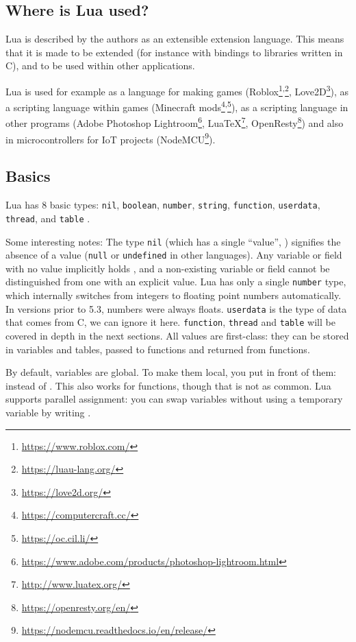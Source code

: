\subsection{Where is Lua used?}
Lua is described by the authors as an extensible extension language\cite{ierusalimschy1996lua}. This means that it is made to be extended (for instance with bindings to libraries written in C), and to be used within other applications.

Lua is used for example as a language for making games (Roblox\footnote{\url{https://www.roblox.com/}}\textsuperscript{,}\footnote{\url{https://luau-lang.org/}}, Love2D\footnote{\url{https://love2d.org/}}), as a scripting language within games (Minecraft mods\footnote{\url{https://computercraft.cc/}}\textsuperscript{,}\footnote{\url{https://oc.cil.li/}}), as a scripting language in other programs (Adobe Photoshop Lightroom\footnote{\url{https://www.adobe.com/products/photoshop-lightroom.html}}, LuaTeX\footnote{\url{http://www.luatex.org/}}, OpenResty\footnote{\url{https://openresty.org/en/}}) and also in microcontrollers for IoT projects (NodeMCU\footnote{\url{https://nodemcu.readthedocs.io/en/release/}}).

\subsection{Basics}
Lua has 8 basic types: \texttt{nil}, \texttt{boolean}, \texttt{number}, \texttt{string}, \texttt{function}, \texttt{userdata}, \texttt{thread}, and \texttt{table} \cite[\S 2.1]{luareferencemanual}.

Some interesting notes:
The type \texttt{nil} (which has a single ``value'', ) signifies the absence of a value (\texttt{null} or \texttt{undefined} in other languages). Any variable or field with no value implicitly holds , and a non-existing variable or field cannot be distinguished from one with an explicit  value.
Lua has only a single \texttt{number} type, which internally switches from integers to floating point numbers automatically. In versions prior to 5.3, numbers were always floats. \texttt{userdata} is the type of data that comes from C, we can ignore it here.
\texttt{function}, \texttt{thread} and \texttt{table} will be covered in depth in the next sections. All values are first-class: they can be stored in variables and tables, passed to functions and returned from functions.

By default, variables are global. To make them local, you put  in front of them:  instead of . This also works for functions, though that is not as common. Lua supports parallel assignment: you can swap variables without using a temporary variable by writing .

